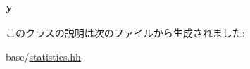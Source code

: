 \label{classStats_1_1Vector2dBase_afe813128131dd3b6a82dd08a2f6786b5}
\hypertarget{classStats_1_1Vector2dBase_a1b61fe296b3ed741d2e46c445c0d0675}{
\subsubsection[{y}]{ {\bf y}}}
\label{classStats_1_1Vector2dBase_a1b61fe296b3ed741d2e46c445c0d0675}


このクラスの説明は次のファイルから生成されました:\begin{DoxyCompactItemize}
\item 
base/\hyperlink{statistics_8hh}{statistics.hh}\end{DoxyCompactItemize}
